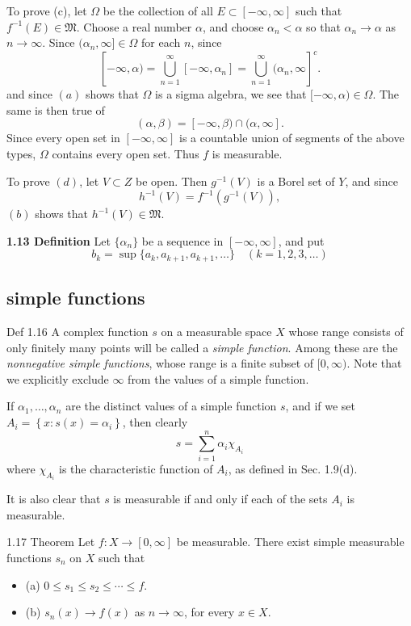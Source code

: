 \documentclass[11pt]{article}
\begin{document}
To prove (c), let \(\Omega\) be the collection of all \(E \subset [-\infty, \infty]\) such that \(f^{-1}(E) \in \mathfrak{M}\). Choose a real number \(\alpha\), and choose \(\alpha_n < \alpha\) so that \(\alpha_n \to \alpha\) as \(n \to \infty\). Since \((\alpha_n, \infty] \in \Omega\) for each \(n\), since
\[ [-\infty, \alpha) = \bigcup_{n=1}^{\infty} [-\infty, \alpha_n] = \bigcup_{n=1}^{\infty} (\alpha_n, \infty]^c. \]
and since \((a)\) shows that \(\Omega\) is a sigma algebra, we see that \([- \infty, \alpha) \in \Omega\). The same is then true of
\[(\alpha, \beta) = [- \infty, \beta) \cap (\alpha, \infty].\]
Since every open set in \([-\infty, \infty]\) is a countable union of segments of the above types, \(\Omega\) contains every open set. Thus \(f\) is measurable.

To prove \((d)\), let \(V \subset Z\) be open. Then \(g ^{-1}(V)\) is a Borel set of \(Y\), and since
\[h^{-1}(V) = f^{-1}(g ^{-1} (V)),\]
\((b)\) shows that \(h^{-1}(V) \in \mathfrak M\).

\medskip
\label{orgfa54f4a} \textbf{1.13 Definition} Let \(\{\alpha_{n} \}\) be a sequence in \([-\infty, \infty]\), and put
\[b_{k} = \sup \{a_{k}, a_{k+1} , a _{k+1}, \dots \}\quad (k = 1,2,3,\dots)\]
\subsection{simple functions}
\label{sec:orgc4123f3}

\label{orgf7d4673}
Def 1.16 A complex function \(s\) on a measurable space \(X\) whose range consists of only finitely many points will be called a \emph{simple function}.
Among these are the \emph{nonnegative simple functions}, whose range is a finite subset of \([0, \infty)\). Note that we explicitly exclude \(\infty\) from the values of a simple function.

If \(\alpha_1, \ldots, \alpha_n\) are the distinct values of a simple function \(s\), and if we set \(A_i=\left\{x: s(x)=\alpha_i\right\}\), then clearly
\[
s=\sum_{i=1}^n \alpha_i \chi_{A_i}
\]
where \(\chi_{A_i}\) is the characteristic function of \(A_i\), as defined in Sec. 1.9(d).

It is also clear that \(s\) is measurable if and only if each of the sets \(A_i\) is measurable.

\label{org351e84d}
1.17 Theorem Let \(f: X \rightarrow[0, \infty]\) be measurable. There exist simple measurable functions \(s_n\) on \(X\) such that

\begin{itemize}
\item (a) \(0 \leq s_1 \leq s_2 \leq \cdots \leq f\).
\item (b) \(s_n(x) \rightarrow f(x)\) as \(n \rightarrow \infty\), for every \(x \in X\).
\end{itemize}
\end{document}
